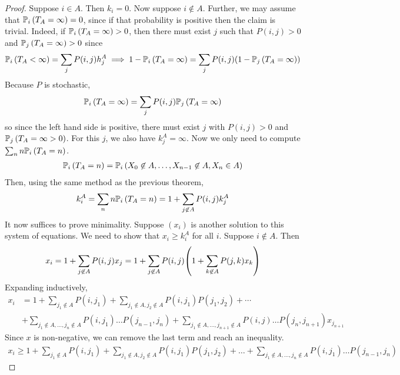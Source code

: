 \begin{proof}
	Suppose $i \in A$.
	Then $k_i = 0$.
	Now suppose $i \not\in A$.
	Further, we may assume that $\mathbb{P}_{i}\left({T_A = \infty}\right) = 0$, since if that probability is positive then the claim is trivial.
	Indeed, if $\mathbb{P}_{i}\left({T_A = \infty}\right) > 0$, then there must exist $j$ such that $P(i,j) > 0$ and $\mathbb{P}_{j}\left({T_A = \infty}\right) > 0$ since
	\begin{align*}
		\mathbb{P}_{i}\left({T_A < \infty}\right) = \sum_j P(i,j) h_j^A \implies 1 - \mathbb{P}_{i}\left({T_A = \infty}\right) = \sum_j P(i,j) \qty(1 - \mathbb{P}_{j}\left({T_A = \infty}\right))
	\end{align*}
	Because $P$ is stochastic,
	\begin{align*}
		\mathbb{P}_{i}\left({T_A = \infty}\right) = \sum_j P(i,j) \mathbb{P}_{j}\left({T_A = \infty}\right)
	\end{align*}
	so since the left hand side is positive, there must exist $j$ with $P(i,j) > 0$ and $\mathbb{P}_{j}\left({T_A = \infty > 0}\right)$.
	For this $j$, we also have $k_j^A = \infty$.
	Now we only need to compute $\sum_n n\mathbb{P}_{i}\left({T_A = n}\right)$.
	\begin{align*}
		\mathbb{P}_{i}\left({T_A = n}\right) = \mathbb{P}_{i}\left({X_0 \not\in A, \dots, X_{n-1} \not\in A, X_n \in A}\right)
	\end{align*}
	Then, using the same method as the previous theorem,
	\begin{align*}
		k_i^A = \sum_n n \mathbb{P}_{i}\left({T_A = n}\right) = 1 + \sum_{j \not\in A} P(i,j) k_j^A
	\end{align*}
	It now suffices to prove minimality.
	Suppose $(x_i)$ is another solution to this system of equations.
	We need to show that $x_i \geq k_i^A$ for all $i$.
	Suppose $i \not\in A$.
	Then
	\begin{align*}
		x_i = 1 + \sum_{j \not\in A} P(i,j) x_j = 1 + \sum_{j \not\in A} P(i,j) \qty(1 + \sum_{k \not\in A} P(j,k) x_k)
	\end{align*}
	Expanding inductively,
	\begin{align*}
		x_i & = 1 + \sum_{j_1 \not\in A} P(i,j_1) + \sum_{j_1 \not\in A, j_2 \not\in A} P(i,j_1)P(j_1,j_2) + \cdots                                                               \\
		    & + \sum_{j_1 \not\in A, \dots, j_n \not\in A} P(i,j_1) \dots P(j_{n-1}, j_n) + \sum_{j_1 \not\in A, \dots, j_{n+1} \not\in A} P(i,j) \dots P(j_n,j_{n+1})x_{j_{n+1}}
	\end{align*}
	Since $x$ is non-negative, we can remove the last term and reach an inequality.
	\begin{align*}
		x_i \geq 1 + \sum_{j_1 \not\in A} P(i,j_1) + \sum_{j_1 \not\in A, j_2 \not\in A} P(i,j_1)P(j_1,j_2) + \dots + \sum_{j_1 \not\in A, \dots, j_n \not\in A} P(i,j_1) \dots P(j_{n-1}, j_n)

\end{align*}
\end{proof}
